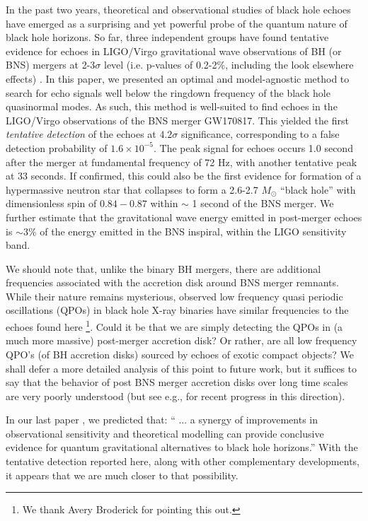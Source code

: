 \documentclass[12pt]{article}
\begin{document}
In the past two years, theoretical and observational studies of black hole echoes have emerged as a surprising and yet powerful probe of the quantum nature of black hole horizons. So far, three independent groups have found tentative evidence for echoes in LIGO/Virgo gravitational wave observations of BH (or BNS) mergers at 2-3$\sigma$ level (i.e. p-values of 0.2-2\%, including the look elsewhere effects)  \cite{Conklin:2017lwb,Abedi:2016hgu, Westerweck:2017hus}. In this paper, we presented an optimal and model-agnostic method to search for echo signals well below the ringdown frequency of the black hole quasinormal modes.  As such, this method is well-suited to find echoes in the LIGO/Virgo observations of the BNS merger GW170817. This yielded the first {\it tentative detection} of the echoes at $4.2\sigma$ significance, corresponding to a false detection probability of $1.6 \times 10^{-5}$. The peak signal for echoes occurs 1.0 second after the merger at fundamental frequency of 72 Hz, with another tentative peak at 33 seconds. If confirmed, this could also be the first evidence for formation of a hypermassive neutron star that collapses to form a 2.6-2.7 $M_\odot$ ``black hole'' with dimensionless spin of $0.84-0.87$ within $\sim$ 1 second of the BNS merger. We further estimate that the gravitational wave energy emitted in post-merger echoes is $\sim 3\%$ of the energy emitted in the BNS inspiral, within the LIGO sensitivity band.   

We should note that, unlike the binary BH mergers, there are additional frequencies associated with the accretion disk around BNS merger remnants. While their nature remains mysterious, observed low frequency quasi periodic oscillations (QPOs) in black hole X-ray binaries have similar frequencies to the echoes found here \cite{Motta:2016vwf}\footnote{We thank Avery Broderick for pointing this out.}. Could it be that we are simply detecting the QPOs in (a much more massive) post-merger accretion disk? Or rather, are all low frequency QPO's (of BH accretion disks) sourced by echoes of exotic compact objects?  We shall defer a more detailed analysis of this point to future work, but it suffices to say that the behavior of post BNS merger accretion disks over long time scales are very poorly understood (but see e.g., \cite{Siegel:2017jug} for recent progress in this direction).   

In our last paper \cite{Abedi:2016hgu}, we predicted that: `` ...  a synergy of improvements in observational sensitivity and theoretical modelling can provide conclusive evidence for quantum gravitational alternatives to black hole horizons.'' With the tentative detection reported here, along with other complementary developments, it appears that we are much closer to that possibility. 
\end{document}
